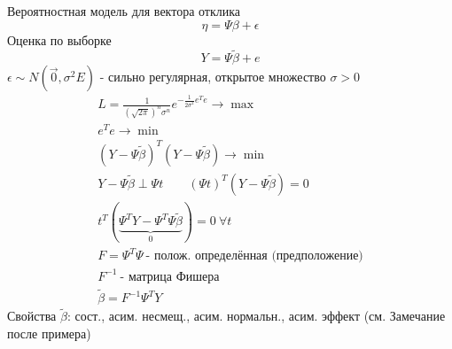 \documentclass{article}
\begin{document}
Вероятностная модель для вектора отклика
\[
  \eta = \Psi \beta + \epsilon
\]
Оценка по выборке
\[
  Y=\Psi \tilde{\beta} + e
\] 
$\epsilon \sim N(\vec{0}, \sigma^{2}E)$ - сильно регулярная, открытое множество $\sigma > 0$
\begin{gather*}
  L=\frac{1}{(\sqrt{2\pi})^{n}\sigma^{n}}e^{-\frac{1}{2\sigma^{2}}e^{T}e} \to \max \\ 
  e^{T}e \to \min \\ 
  (Y-\Psi\tilde{\beta})^{T}(Y-\Psi \tilde{\beta}) \to \min \\ 
  Y-\Psi \tilde{\beta} \perp \Psi t \qquad (\Psi t)^{T}(Y-\Psi \tilde{\beta})=0 \\ 
  t^{T}(\underbrace{\Psi^{T}Y-\Psi^{T}\Psi \tilde{\beta}}_{0})=0 \ \forall t \\ 
  F=\Psi^{T}\Psi \ \text{- полож. определённая (предположение)} \\ 
  F^{-1} \ \text{- матрица Фишера} \\ 
  \tilde{\beta}=F^{-1}\Psi^{T} Y
\end{gather*}
Свойства $\tilde{\beta}$: сост., асим. несмещ., асим. нормальн., асим. эффект (см. Замечание после примера)
\end{document}
